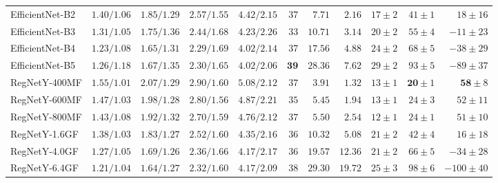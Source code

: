 \begin{table}
\begin{adjustbox}{angle=90, max height=0.9\textheight}
\begin{tabular}{lrrrrrrrrrr}
        EfficientNet-B2 & $1.40/1.06         $ & $ 1.85/1.29         $ & $ 2.57/1.55         $ & $  4.42/2.15                  $ & $  37         $ & $ 7.71$ & $ 2.16$ & $17          \pm 2$ & $41          \pm 1$ & $  18          \pm 16$ \\
        EfficientNet-B3 & $1.31/1.05         $ & $ 1.75/1.36         $ & $ 2.44/1.68         $ & $  4.23/2.26                  $ & $  33         $ & $10.71$ & $ 3.14$ & $20          \pm 2$ & $55          \pm 4$ & $- 11          \pm 23$ \\
        EfficientNet-B4 & $\mathbf{1.23}/1.08$ & $ \mathbf{1.65}/1.31$ & $ \mathbf{2.29}/1.69$ & $  \mathbf{4.02}/2.14         $ & $  37         $ & $17.56$ & $ 4.88$ & $24          \pm 2$ & $68          \pm 5$ & $- 38          \pm 29$ \\
        EfficientNet-B5 & $1.26/1.18         $ & $ 1.67/1.35         $ & $ \mathbf{2.30}/1.65$ & $  \mathbf{4.02}/\mathbf{2.06}$ & $  \mathbf{39}$ & $28.36$ & $ 7.62$ & $29          \pm 2$ & $93          \pm 5$ & $- 89          \pm 37$ \\
        RegNetY-400MF   & $1.55/\mathbf{1.01}$ & $ 2.07/1.29         $ & $ 2.90/1.60         $ & $  5.08/2.12                  $ & $  37         $ & $ 3.91$ & $ 1.32$ & $13          \pm 1$ & $\mathbf{20} \pm 1$ & $  \mathbf{58} \pm  8$ \\
        RegNetY-600MF   & $1.47/1.03         $ & $ 1.98/1.28         $ & $ 2.80/1.56         $ & $  4.87/2.21                  $ & $  35         $ & $ 5.45$ & $ 1.94$ & $13          \pm 1$ & $24          \pm 3$ & $  52          \pm 11$ \\
        RegNetY-800MF   & $1.43/1.08         $ & $ 1.92/1.32         $ & $ 2.70/1.59         $ & $  4.76/2.12                  $ & $  37         $ & $ 5.50$ & $ 2.54$ & $12          \pm 1$ & $24          \pm 1$ & $  51          \pm 10$ \\
        RegNetY-1.6GF   & $1.38/1.03         $ & $ 1.83/1.27         $ & $ 2.52/1.60         $ & $  4.35/2.16                  $ & $  36         $ & $10.32$ & $ 5.08$ & $21          \pm 2$ & $42          \pm 4$ & $  16          \pm 18$ \\
        RegNetY-4.0GF   & $1.27/1.05         $ & $ 1.69/\mathbf{1.26}$ & $ 2.36/1.66         $ & $  4.17/2.17                  $ & $  36         $ & $19.57$ & $12.36$ & $21          \pm 2$ & $66          \pm 5$ & $- 34          \pm 28$ \\
        RegNetY-6.4GF   & $\mathbf{1.21}/1.04$ & $ \mathbf{1.64}/1.27$ & $ 2.32/1.60         $ & $  4.17/2.09                  $ & $  38         $ & $29.30$ & $19.72$ & $25          \pm 3$ & $98          \pm 6$ & $-100          \pm 40$ \\

\end{tabular}
\end{adjustbox}
\end{table}
